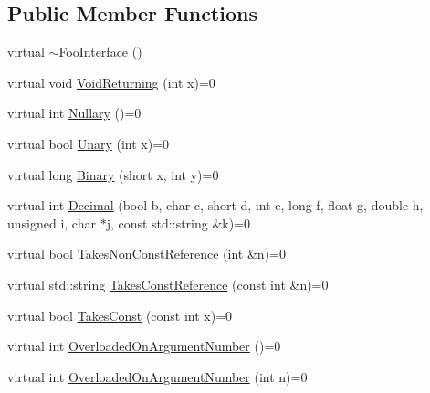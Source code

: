 \subsection*{Public Member Functions}
\begin{DoxyCompactItemize}
\item 
virtual \mbox{\hyperlink{classtesting_1_1gmock__generated__function__mockers__test_1_1FooInterface_ad4eb4709c9ae9b1cdaded8d05567cdbb}{$\sim$\+Foo\+Interface}} ()
\item 
virtual void \mbox{\hyperlink{classtesting_1_1gmock__generated__function__mockers__test_1_1FooInterface_adf968115cf1260004d8abe372dc71c85}{Void\+Returning}} (int x)=0
\item 
virtual int \mbox{\hyperlink{classtesting_1_1gmock__generated__function__mockers__test_1_1FooInterface_a633e753eafa7f82dde22ecf9492f341c}{Nullary}} ()=0
\item 
virtual bool \mbox{\hyperlink{classtesting_1_1gmock__generated__function__mockers__test_1_1FooInterface_ae0885ac29bc4a3f180f6573d8b1a341e}{Unary}} (int x)=0
\item 
virtual long \mbox{\hyperlink{classtesting_1_1gmock__generated__function__mockers__test_1_1FooInterface_a59ea28b711ece054ce9d57c2dc574ba0}{Binary}} (short x, int y)=0
\item 
virtual int \mbox{\hyperlink{classtesting_1_1gmock__generated__function__mockers__test_1_1FooInterface_a5a389017205848c7b7055c071cca0c6d}{Decimal}} (bool b, char c, short d, int e, long f, float g, double h, unsigned i, char $\ast$j, const std\+::string \&k)=0
\item 
virtual bool \mbox{\hyperlink{classtesting_1_1gmock__generated__function__mockers__test_1_1FooInterface_a694354adfffcee58093298bc12182ff5}{Takes\+Non\+Const\+Reference}} (int \&n)=0
\item 
virtual std\+::string \mbox{\hyperlink{classtesting_1_1gmock__generated__function__mockers__test_1_1FooInterface_aae85be7a3d1b53625fbeeac4694292d3}{Takes\+Const\+Reference}} (const int \&n)=0
\item 
virtual bool \mbox{\hyperlink{classtesting_1_1gmock__generated__function__mockers__test_1_1FooInterface_a8c53e87edf0b9da878e5259f02b7f5dc}{Takes\+Const}} (const int x)=0
\item 
virtual int \mbox{\hyperlink{classtesting_1_1gmock__generated__function__mockers__test_1_1FooInterface_ae9e86ac64fa9acedfb1fa747174c7f43}{Overloaded\+On\+Argument\+Number}} ()=0
\item 
virtual int \mbox{\hyperlink{classtesting_1_1gmock__generated__function__mockers__test_1_1FooInterface_a1b5ff8cc745af475e0abba5d2858e1c9}{Overloaded\+On\+Argument\+Number}} (int n)=0

\end{DoxyCompactItemize}
